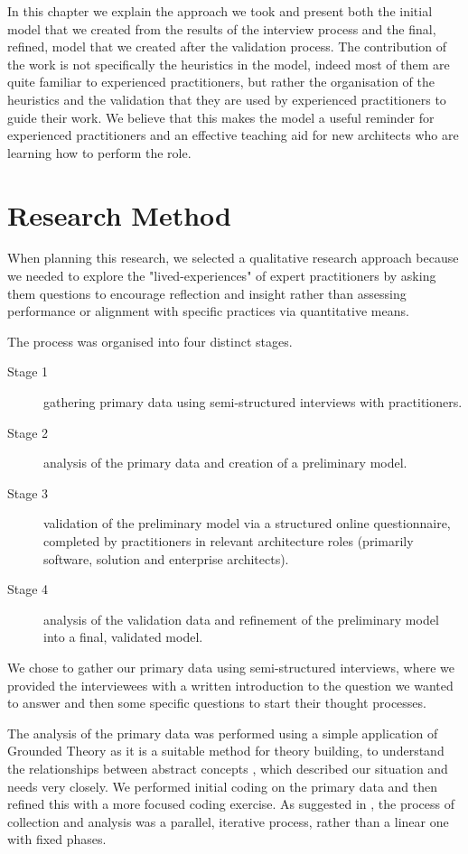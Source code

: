 In this chapter we explain the approach we took and present both the initial model that we created from the results of the interview process and the final, refined, model that we created after the validation process.  The contribution of the work is not specifically the heuristics in the model, indeed most of them are quite familiar to experienced practitioners, but rather the organisation of the heuristics and the validation that they are used by experienced practitioners to guide their work.  We believe that this makes the model a useful reminder for experienced practitioners and an effective teaching aid for new architects who are learning how to perform the role.

\section{Research Method}

When planning this research, we selected a qualitative research approach because we needed to explore the "lived-experiences" of expert practitioners by asking them questions to encourage reflection and insight \cite{lapan2012-qualitativeresearch} rather than assessing performance or alignment with specific practices via quantitative means.

The process was organised into four distinct stages.

\begin{description}
	\item [Stage 1] gathering primary data using semi-structured interviews with practitioners.
	\item [Stage 2] analysis of the primary data and creation of a preliminary model.
	\item [Stage 3] validation of the preliminary model via a structured online questionnaire, completed by practitioners in relevant architecture roles (primarily software, solution and enterprise architects).
	\item [Stage 4] analysis of the validation data and refinement of the preliminary model into a final, validated model.
\end{description}

We chose to gather our primary data using semi-structured interviews, where we provided the interviewees with a written introduction to the question we wanted to answer and then some specific questions to start their thought processes. 

The analysis of the primary data was performed using a simple application of Grounded Theory as it is a suitable method for theory building, to understand the relationships between abstract concepts \cite{charmaz2006-groundedtheory}, which described our situation and needs very closely.  We performed initial coding on the primary data and then refined this with a more focused coding exercise.  As suggested in \cite{lapan2012-qualitativeresearch}, the process of collection and analysis was a parallel, iterative process, rather than a linear one with fixed phases.  

